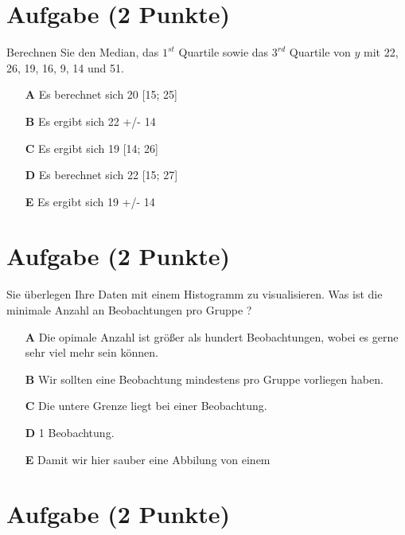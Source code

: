 \documentclass[a4paper, 9pt]{scrartcl}\usepackage[]{graphicx}\usepackage[]{xcolor}
\begin{document}
\section{Aufgabe \hfill (2 Punkte)}




Berechnen Sie den Median, das $1^{st}$ Quartile sowie das $3^{rd}$ Quartile von $y$ mit 22, 26, 19, 16, 9, 14 und 51.




\begin{enumerate}
\item [\textbf{A} \msquare] Es berechnet sich 20 [15; 25]
\item [\textbf{B} \msquare] Es ergibt sich 22 +/- 14
\item [\textbf{C} \msquare] Es ergibt sich 19 [14; 26]
\item [\textbf{D} \msquare] Es berechnet sich 22 [15; 27]
\item [\textbf{E} \msquare] Es ergibt sich 19 +/- 14
\end{enumerate} 

\section{Aufgabe \hfill (2 Punkte)}



Sie überlegen Ihre Daten mit einem Histogramm zu visualisieren. Was ist die minimale Anzahl an Beobachtungen pro Gruppe ?



\begin{enumerate}
\item [\textbf{A} \msquare] Die opimale Anzahl ist größer als hundert Beobachtungen, wobei es gerne sehr viel mehr sein können.
\item [\textbf{B} \msquare] Wir sollten eine Beobachtung mindestens pro Gruppe vorliegen haben.
\item [\textbf{C} \msquare] Die untere Grenze liegt bei einer Beobachtung.
\item [\textbf{D} \msquare] 1 Beobachtung.
\item [\textbf{E} \msquare] Damit wir hier sauber eine Abbilung von einem 
\end{enumerate}

\section{Aufgabe \hfill (2 Punkte)}
\end{document}
